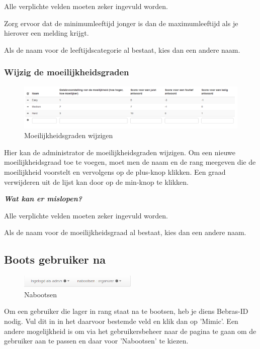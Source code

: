 \documentclass[]{article}
\begin{document}
Alle verplichte velden moeten zeker ingevuld worden.

Zorg ervoor dat de minimumleeftijd jonger is dan de maximumleeftijd als je hierover een melding krijgt.

Als de naam voor de leeftijdscategorie al bestaat, kies dan een andere naam.

\subsubsection{Wijzig de moeilijkheidsgraden}

\begin{figure}[!ht]
	\centering
	\includegraphics[width=1\textwidth]{img/difficulty}
	\caption{Moeilijkheidsgraden wijzigen}
	\label{difficulty}
\end{figure}

Hier kan de administrator de moeilijkheidsgraden wijzigen. Om een nieuwe moeilijkheidsgraad toe te voegen, moet men de naam en de rang meegeven die de moeilijkheid voorstelt en vervolgens op de plus-knop klikken. Een graad verwijderen uit de lijst kan door op de min-knop te klikken.

\textbf{\textit{Wat kan er mislopen?}}

Alle verplichte velden moeten zeker ingevuld worden.

Als de naam voor de moeilijkheidsgraad al bestaat, kies dan een andere naam.

\subsection{Boots gebruiker na}

\begin{figure}[!ht]
	\centering
	\includegraphics[width=0.5\textwidth]{img/mimic}
	\caption{Nabootsen}
	\label{mimic}
\end{figure}

Om een gebruiker die lager in rang staat na te bootsen, heb je diens Bebras-ID nodig. Vul dit in in het daarvoor bestemde veld en klik dan op 'Mimic'. Een andere mogelijkheid is om via het gebruikersbeheer naar de pagina te gaan om de gebruiker aan te passen en daar voor 'Nabootsen' te kiezen.
\end{document}
